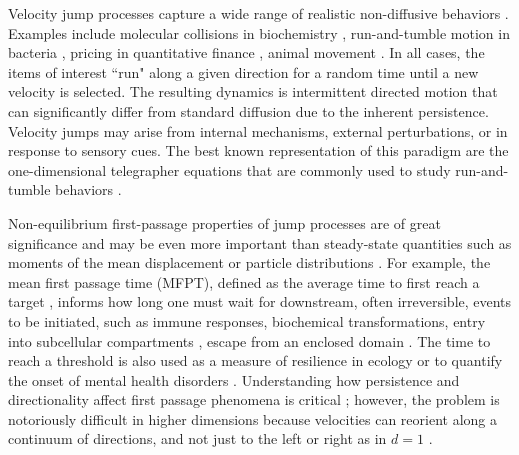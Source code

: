 \documentclass[
 reprint,










 amsmath,amssymb,
 aps, prl,






longbibliography
]{revtex4-2}
\begin{document}
\maketitle


Velocity jump processes capture a wide range of realistic non-diffusive
behaviors \cite{VanKampen1981, Klages2008}.
Examples include molecular collisions in biochemistry \cite{Hanggi1990},
run-and-tumble motion in bacteria \cite{Newby2011,Scacchi2018, Dhar2019, Angelani2014,iyaniwura2025meanpassagetimeactive},
pricing in quantitative finance \cite{Bielecki2004, Masoliver2008, Perello2011},
animal movement \cite{Fauchald2003, Benichou2011, Kurella2015, Costa2024}.
In all cases, the items of interest ``run" along a given direction for a random time
until a new velocity is selected.
The resulting dynamics is intermittent directed motion that can significantly differ from standard
diffusion due to the inherent persistence.
Velocity jumps may arise from internal mechanisms,
external perturbations, or in response to sensory cues.
The best known
representation of this paradigm
are the one-dimensional telegrapher equations
that are commonly used to study run-and-tumble behaviors \cite{Heaviside1970, hillen2013transport,HillenReview,Angelani2015}.

Non-equilibrium first-passage properties of jump processes
are of great significance and may be even more important than
steady-state quantities such as
moments of the mean displacement or particle distributions \cite{Datta2024}.
For example, the mean first passage time (MFPT), defined as
the average time to first reach a target  \cite{Redner2001}, informs
how long one must wait for downstream, often irreversible, events to
be initiated, such as immune responses, biochemical transformations,
entry into subcellular compartments \cite{Ghusinga2017, Dorsogna2009, Nowak2009},
escape from an enclosed domain \cite{Condamin2008, Bressloff2013, Gardiner2004}.
The time to reach a threshold is also used as a measure
of resilience in ecology \cite{Arani2021} or to quantify the onset of
mental health disorders \cite{Mao2024}.
Understanding how persistence and directionality
affect
first passage phenomena is critical  \cite{
Camley2014, Sevilla2019, Artuso2018, Klinger2023, Vezzani2024};
however, the problem is notoriously difficult in
higher dimensions because velocities can reorient
along a continuum of directions, and
not just to the left or right
as in $d=1$  \cite{Rupprecht2016, Grebenkov2016, Mori2020}.
\end{document}
